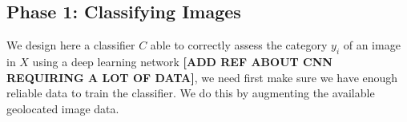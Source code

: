 \subsection{Phase 1: Classifying Images}
We design here a classifier $C$  able to correctly assess the category $y_i$ of an image in $X$ using a deep learning network \textbf{[ADD REF ABOUT CNN REQUIRING A LOT OF DATA]}, we need first make sure we have enough reliable data to train the classifier. We do this by augmenting the available geolocated image data. 


 
